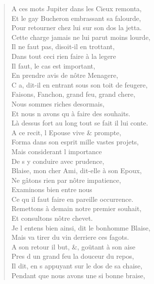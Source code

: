 \begin{verse}
A ces mots Jupiter dans les Cieux remonta, \\
Et le gay Bucheron embrassant sa falourde, \\
Pour retourner chez lui sur son dos la jetta. \\
Cette charge jamais ne lui parut moins lourde, \\
\vin Il ne faut pas, disoit-il en trottant, \\
\vin Dans tout ceci rien faire à la legere \\
\vin Il faut, le cas est important, \\
En prendre avis de nôtre Menagere, \\
C\textquotesingle{} a, dit-il en entrant sous son toit de feugere, \\
\vin Faisons, Fanchon, grand feu, grand\textquotesingle{} chere, \\
\vin Nous sommes riches desormais, \\
\vin Et nous n\textquotesingle{} avons qu\textquotesingle{} à faire des souhaits. \\
Là dessus fort au long tout se fait il lui conte. \\
\vin A ce recit, l\textquotesingle{} Epouse vive \& prompte, \\
Forma dans son esprit mille vastes projets, \\
\vin Mais considerant l\textquotesingle{} importance \\
\vin De s\textquotesingle{} y conduire avec prudence, \\
Blaise, mon cher Ami, dit-elle à son Epoux, \\
\vin Ne gâtons rien par nôtre impatience, \\
\vin Examinons bien entre nous \\
\vin Ce qu\textquotesingle{} il faut faire en pareille occurrence. \\
Remettons à demain notre premier souhait, \\
\vin Et consultons nôtre chevet. \\
Je l\textquotesingle{} entens bien ainsi, dit le bonhomme Blaise, \\
Mais va tirer du vin derriere ces fagots. \\
A son retour il but, \&, goütant à son aise \\
\vin Pres d\textquotesingle{} un grand feu la douceur du repos, \\
Il dit, en s\textquotesingle{} appuyant sur le dos de sa chaise, \\
Pendant que nous avons une si bonne braise, \\

\end{verse}
